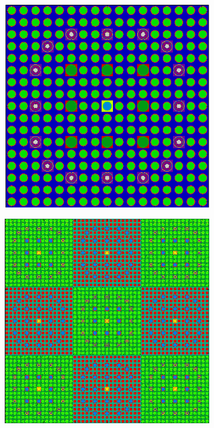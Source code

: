 \begin{figure}
\begin{subfigure}{.5\textwidth}
  \centering
  \includegraphics[width=.7\linewidth]{figures/workflow/opencg/cells-xy-24-16-assm}
  \caption{}
  \label{fig:assm-cells}
\end{subfigure}%
\begin{subfigure}{.5\textwidth}
  \centering
  \includegraphics[width=.7\linewidth]{figures/workflow/opencg/cells-xy-colorset}
  \caption{}
  \label{fig:colorset-cells}
\end{subfigure}
\begin{subfigure}{.5\textwidth}
  \centering

\end{subfigure}
\end{figure}
